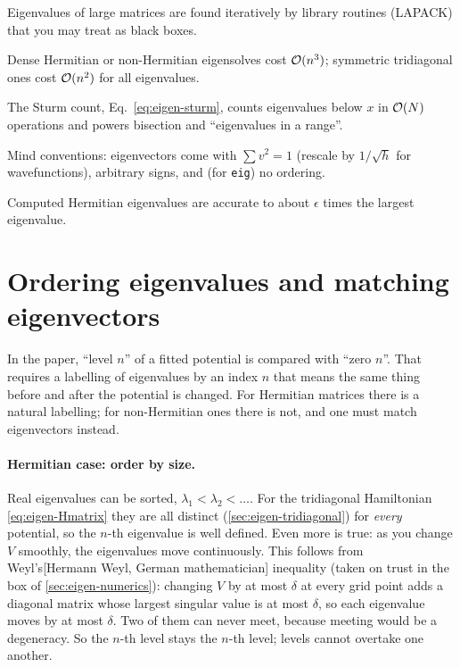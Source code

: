\begin{keyideas}
\item Eigenvalues of large matrices are found iteratively by library routines (LAPACK) that you may treat as black boxes.
\item Dense Hermitian or non-Hermitian eigensolves cost $\mathcal{O}(n^3)$; symmetric tridiagonal ones cost $\mathcal{O}(n^2)$ for all eigenvalues.
\item The Sturm count, Eq.~\eqref{eq:eigen-sturm}, counts eigenvalues below $x$ in $\mathcal{O}(N)$ operations and powers bisection and ``eigenvalues in a range''.
\item Mind conventions: eigenvectors come with $\sum v^2=1$ (rescale by $1/\sqrt h$ for wavefunctions), arbitrary signs, and (for \texttt{eig}) no ordering.
\item Computed Hermitian eigenvalues are accurate to about $\epsilon$ times the largest eigenvalue.
\end{keyideas}

\section{Ordering eigenvalues and matching eigenvectors}\label{sec:eigen-matching}

In the paper, ``level $n$'' of a fitted potential is compared with ``zero $n$''. That requires a labelling of eigenvalues by an index $n$ that means the same thing before and after the potential is changed. For Hermitian matrices there is a natural labelling; for non-Hermitian ones there is not, and one must match eigenvectors instead.

\paragraph{Hermitian case: order by size.} Real eigenvalues can be sorted, $\lambda_1<\lambda_2<\dots$. For the tridiagonal Hamiltonian \eqref{eq:eigen-Hmatrix} they are all distinct (\cref{sec:eigen-tridiagonal}) for \emph{every} potential, so the $n$-th eigenvalue is well defined. Even more is true: as you change $V$ smoothly, the eigenvalues move continuously. This follows from Weyl's[Hermann Weyl, German mathematician] inequality (taken on trust in the box of \cref{sec:eigen-numerics}): changing $V$ by at most $\delta$ at every grid point adds a diagonal matrix whose largest singular value is at most $\delta$, so each eigenvalue moves by at most $\delta$. Two of them can never meet, because meeting would be a degeneracy. So the $n$-th level stays the $n$-th level; levels cannot overtake one another.


